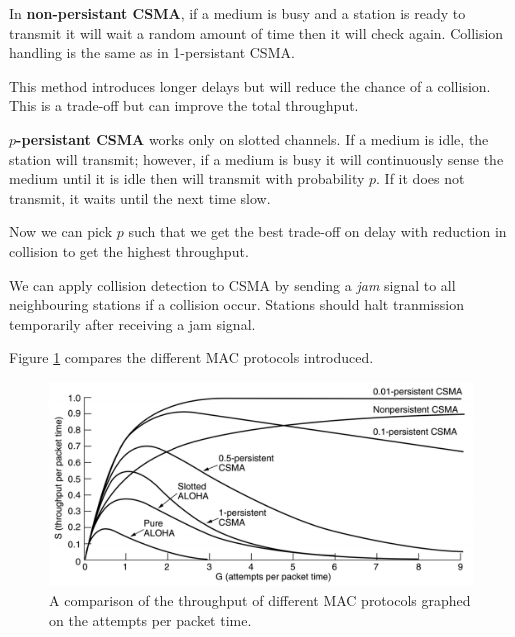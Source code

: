 \begin{example}
    In \textbf{non-persistant CSMA}, if a medium is busy and a station is ready to transmit it will wait a random amount of time then it will check again. Collision handling is the same as in 1-persistant CSMA.
\end{example}

This method introduces longer delays but will reduce the chance of a collision. This is a trade-off but can improve the total throughput. 

\begin{example}
    \textbf{$p$-persistant CSMA} works only on slotted channels. If a medium is idle, the station will transmit; however, if a medium is busy it will continuously sense the medium until it is idle then will transmit with probability $p$. If it does not transmit, it waits until the next time slow.
\end{example}

Now we can pick $p$ such that we get the best trade-off on delay with reduction in collision to get the highest throughput.

\begin{example}
    We can apply collision detection to CSMA by sending a \emph{jam} signal to all neighbouring stations if a collision occur. Stations should halt tranmission temporarily after receiving a jam signal.
\end{example}

Figure \ref{fig:mac-protocol-comparison} compares the different MAC protocols introduced.

\begin{figure}
    \centering
    \includegraphics[width=0.8\linewidth]{images/mac-protocol-comparison.png}
    \caption{A comparison of the throughput of different MAC protocols graphed on the attempts per packet time.}
    \label{fig:mac-protocol-comparison}
\end{figure}

